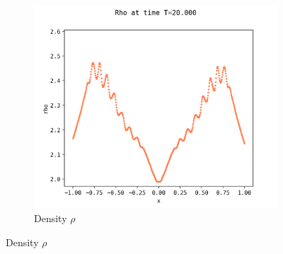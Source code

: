 \documentclass{article}
\numberwithin{equation}{section}
\newcommand{\imh}{\textheight} %
\newcommand{\imw}{\textwidth} %
\begin{document}
\begin{figure}
\begin{subfigure}{\textwidth}
		\includegraphics[height=\imh,width=\imw]{images/rhoT20_512_2.png}
		\caption{Density $\rho$}
		\label{subfig:compT02_rho}
	\end{subfigure}
	

\end{figure}
\end{document}
